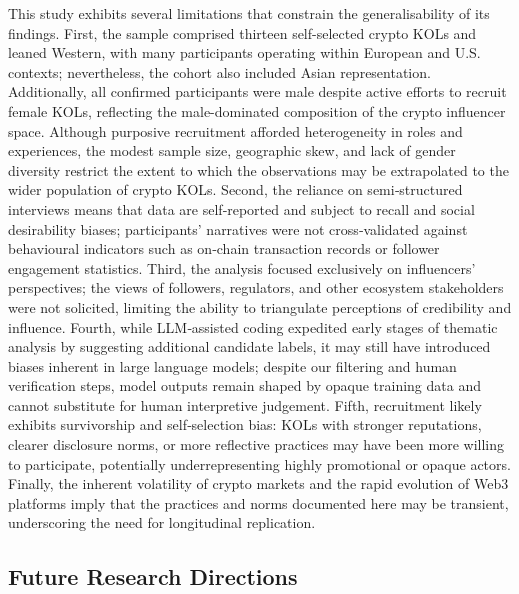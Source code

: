 This study exhibits several limitations that constrain the generalisability of its findings. First, the sample comprised thirteen self-selected crypto KOLs and leaned Western, with many participants operating within European and U.S. contexts; nevertheless, the cohort also included Asian representation. Additionally, all confirmed participants were male despite active efforts to recruit female KOLs, reflecting the male-dominated composition of the crypto influencer space. Although purposive recruitment afforded heterogeneity in roles and experiences, the modest sample size, geographic skew, and lack of gender diversity restrict the extent to which the observations may be extrapolated to the wider population of crypto KOLs. Second, the reliance on semi‑structured interviews means that data are self‑reported and subject to recall and social desirability biases; participants' narratives were not cross‑validated against behavioural indicators such as on‑chain transaction records or follower engagement statistics. Third, the analysis focused exclusively on influencers' perspectives; the views of followers, regulators, and other ecosystem stakeholders were not solicited, limiting the ability to triangulate perceptions of credibility and influence. Fourth, while LLM‑assisted coding expedited early stages of thematic analysis by suggesting additional candidate labels, it may still have introduced biases inherent in large language models; despite our filtering and human verification steps, model outputs remain shaped by opaque training data and cannot substitute for human interpretive judgement. Fifth, recruitment likely exhibits survivorship and self‑selection bias: KOLs with stronger reputations, clearer disclosure norms, or more reflective practices may have been more willing to participate, potentially underrepresenting highly promotional or opaque actors. Finally, the inherent volatility of crypto markets and the rapid evolution of Web3 platforms imply that the practices and norms documented here may be transient, underscoring the need for longitudinal replication.

\subsection{Future Research Directions}

